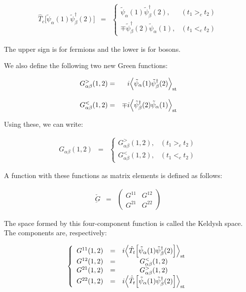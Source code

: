 \documentclass[uplatex,a4j,12pt,dvipdfmx]{jsarticle}
\begin{document}
\begin{eqnarray}
	\hat{T}_{c}
	\Big[ \tilde{\psi}_{\alpha}(1) \tilde{\psi}_{\beta}^{\dagger}(2) \Big]
	&=&
	\left\{
	\begin{array}{ll}
		\tilde{\psi}_{\alpha}(1) \tilde{\psi}_{\beta}^{\dagger}(2),     & (t_{1} >_{c} t_{2})
		\\[3mm]
		\mp \tilde{\psi}_{\beta}^{\dagger}(2) \tilde{\psi}_{\alpha}(1), & (t_{1} <_{c} t_{2})
	\end{array}
	\right.
\end{eqnarray}

The upper sign is for fermions and the lower is for bosons.

We also define the following two new Green functions:

\begin{eqnarray}
	G^{>}_{\alpha \beta}(1,2)
	&=&
	i \Big\langle \tilde{\psi}_{\alpha}(1) \tilde{\psi}_{\beta}^{\dagger}(2) \Big\rangle_{\rm st}
	\\[3mm]
	G^{<}_{\alpha \beta}(1,2)
	&=&
	\mp i \Big\langle \tilde{\psi}_{\beta}^{\dagger}(2) \tilde{\psi}_{\alpha}(1) \Big\rangle_{\rm st}
\end{eqnarray}

Using these, we can write:

\begin{eqnarray}
	G_{\alpha \beta}(1,2)
	&=&
	\left\{
	\begin{array}{ll}
		G^{>}_{\alpha \beta}(1,2), & (t_{1} >_{c} t_{2})
		\\[3mm]
		G^{<}_{\alpha \beta}(1,2), & (t_{1} <_{c} t_{2})
	\end{array}
	\right.
\end{eqnarray}

A function with these functions as matrix elements is defined as follows:

\begin{eqnarray}
	\check{\underbar{G}}
	&=&
	\left(
	\begin{array}{ll}
			G^{11} & G^{12}
			\\
			G^{21} & G^{22}
		\end{array}
	\right)
\end{eqnarray}

The space formed by this four-component function is called the Keldysh space.
The components are, respectively:

\begin{eqnarray}
	\left\{
	\begin{array}{llc}
		G^{11}(1,2) & = & i \Big\langle \hat{T}_{t} \Big[ \tilde{\psi}_{\alpha}(1) \tilde{\psi}_{\beta}^{\dagger}(2) \Big] \Big\rangle_{\rm st}
		\\
		G^{12}(1,2) & = & G^{<}_{\alpha \beta}(1,2)
		\\
		G^{21}(1,2) & = & G^{>}_{\alpha \beta}(1,2)
		\\
		G^{22}(1,2) & = & i \Big\langle \hat{\bar{T}}_{t} \Big[ \tilde{\psi}_{\alpha}(1) \tilde{\psi}_{\beta}^{\dagger}(2) \Big] \Big\rangle_{\rm st}
	\end{array}
	\right.
\end{eqnarray}
\end{document}
